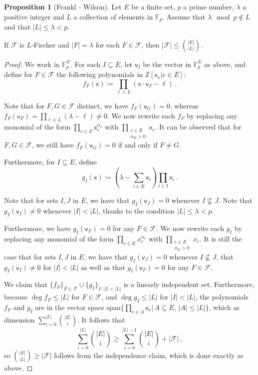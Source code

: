 \documentclass[12pt]{amsart}
\theoremstyle{definition}
\newtheorem{prop}[thm]{Proposition}
\newcommand{\Z}{\mathbb{Z}}
\newcommand{\F}{\mathbb{F}}
\newcommand{\FF}{\mathcal F}
\newcommand{\vv}{\mathsf{v}}
\newcommand{\vx}{\mathsf{x}}
\newcommand{\spn}{\mathrm{span}}
\begin{document}
\begin{prop}[Frankl - Wilson]
Let $E$ be a finite set, $p$ a prime number, $\lambda$ a positive integer and $L$ a collection of elements in $\F_p$.
Assume that $\lambda \mod p\not\in L$ and that $|L| \leq \lambda < p$.


If $\FF$ is $L$-Fischer and $|F| = \lambda $ for each $F \in \FF$, then $|\FF| \leq \binom{|E|}{|L|}$.
\end{prop}

\begin{proof}
We work in $\F_p^E$.
For each $I \subseteq E$, let $\vv_I$ be the vector in $\F_p^E$ as above, and define for $F \in \FF$ the following polynomials in $\Z[\vx_e | e \in E]$:
$$f_F(\vx) \coloneqq \prod_{\ell \in L } (\vx \cdot \vv_{F} - \ell ) \, .$$

Note that for $F, G \in \FF$ distinct, we have $f_F(\vv_G) = 0$, whereas $f_F(\vv_F) = \prod_{\ell \in L } (\lambda - \ell )\neq 0$.
We now rewrite each $f_F$ by replacing any monomial of the form $\prod_{e\in E}\vx_e^{\alpha_e}$ with $\prod_{\substack{e\in E\\ \alpha_E > 0}}\vx_e$.
It can be observed that for $F, G \in \FF$, we still have $f_F(\vv_G) = 0$ if and only if $F \neq G$.

Furthermore, for $I\subseteq E$, define 
$$g_I(\vx) \coloneqq (\lambda - \sum_{i\in E} \vx_i)\prod_{i\in I} \vx_i\, .$$

Note that for sets $I, J$ in $E$, we have that $g_I(\vv_J ) = 0$ whenever $I\not\subseteq J$.
Note that $g_I(\vv_I) \neq 0$ whenever $|I| < |L|$, thanks to the condition $|L| \leq \lambda < p$.

Furthermore, we have $g_I(\vv_F) = 0$ for any $F \in \FF$.
We now rewrite each $g_I$ by replacing any monomial of the form $\prod_{e\in E}x_e^{\alpha_e}$ with $\prod_{\substack{e\in E\\ \alpha_E > 0}}x_e$.
It is still the case that for sets $I, J$ in $E$, we have that $g_I(\vv_J ) = 0$ whenever $I\not\subseteq J$, that $g_I(\vv_I) \neq 0$ for $|I| < |L|$ as well as that $g_I(\vv_F) = 0$ for any $F \in \FF$.

We claim that $\{ f_F \}_{F \in \FF}\cup \{g_I \}_{I \, : |I| < |L| }$ is a linearly independent set.
Furthermore, because $\deg f_F \leq |L|$ for $F \in \FF$, and $\deg g_I \leq |L|$ for $|I| < |L|$, the polynomials $f_F$ and $g_I$ are in the vector space $\spn\{\prod_{e \in A} \vx_e | \, A \subseteq E, \, |A| \leq |L| \}$, which as dimension $\sum_{i=0}^{|L|} \binom{|E|}{i}$.
It follows that
$$ \sum_{i=0}^{|L|} \binom{|E|}{i} \geq \sum_{i=0}^{|L|-1} \binom{|E|}{i} + |\FF| \, ,$$
so $\binom{|E|}{|L|} \geq |\FF|$ follows from the independence claim, which is done exactly as above.
\end{proof}
\end{document}
